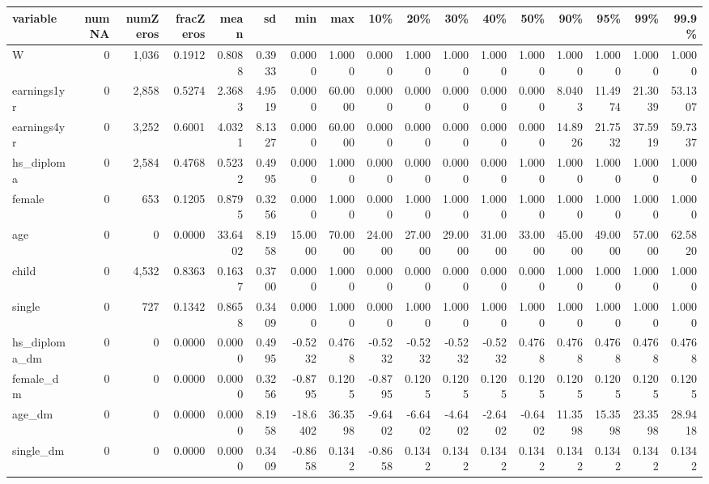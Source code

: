
\begin{tabular}{lrrrrrrrrrrrrrrrr}
\toprule
variable & numNA & numZeros & fracZeros & mean & sd & min & max & 10\% & 20\% & 30\% & 40\% & 50\% & 90\% & 95\% & 99\% & 99.9\%\\
\midrule
W & 0 & 1,036 & 0.1912 & 0.8088 & 0.3933 & 0.0000 & 1.0000 & 0.0000 & 1.0000 & 1.0000 & 1.0000 & 1.0000 & 1.0000 & 1.0000 & 1.0000 & 1.0000\\
earnings1yr & 0 & 2,858 & 0.5274 & 2.3683 & 4.9519 & 0.0000 & 60.0000 & 0.0000 & 0.0000 & 0.0000 & 0.0000 & 0.0000 & 8.0403 & 11.4974 & 21.3039 & 53.1307\\
earnings4yr & 0 & 3,252 & 0.6001 & 4.0321 & 8.1327 & 0.0000 & 60.0000 & 0.0000 & 0.0000 & 0.0000 & 0.0000 & 0.0000 & 14.8926 & 21.7532 & 37.5919 & 59.7337\\
hs\_diploma & 0 & 2,584 & 0.4768 & 0.5232 & 0.4995 & 0.0000 & 1.0000 & 0.0000 & 0.0000 & 0.0000 & 0.0000 & 1.0000 & 1.0000 & 1.0000 & 1.0000 & 1.0000\\
female & 0 & 653 & 0.1205 & 0.8795 & 0.3256 & 0.0000 & 1.0000 & 0.0000 & 1.0000 & 1.0000 & 1.0000 & 1.0000 & 1.0000 & 1.0000 & 1.0000 & 1.0000\\
\addlinespace
age & 0 & 0 & 0.0000 & 33.6402 & 8.1958 & 15.0000 & 70.0000 & 24.0000 & 27.0000 & 29.0000 & 31.0000 & 33.0000 & 45.0000 & 49.0000 & 57.0000 & 62.5820\\
child & 0 & 4,532 & 0.8363 & 0.1637 & 0.3700 & 0.0000 & 1.0000 & 0.0000 & 0.0000 & 0.0000 & 0.0000 & 0.0000 & 1.0000 & 1.0000 & 1.0000 & 1.0000\\
single & 0 & 727 & 0.1342 & 0.8658 & 0.3409 & 0.0000 & 1.0000 & 0.0000 & 1.0000 & 1.0000 & 1.0000 & 1.0000 & 1.0000 & 1.0000 & 1.0000 & 1.0000\\
hs\_diploma\_dm & 0 & 0 & 0.0000 & 0.0000 & 0.4995 & -0.5232 & 0.4768 & -0.5232 & -0.5232 & -0.5232 & -0.5232 & 0.4768 & 0.4768 & 0.4768 & 0.4768 & 0.4768\\
female\_dm & 0 & 0 & 0.0000 & 0.0000 & 0.3256 & -0.8795 & 0.1205 & -0.8795 & 0.1205 & 0.1205 & 0.1205 & 0.1205 & 0.1205 & 0.1205 & 0.1205 & 0.1205\\
\addlinespace
age\_dm & 0 & 0 & 0.0000 & 0.0000 & 8.1958 & -18.6402 & 36.3598 & -9.6402 & -6.6402 & -4.6402 & -2.6402 & -0.6402 & 11.3598 & 15.3598 & 23.3598 & 28.9418\\
single\_dm & 0 & 0 & 0.0000 & 0.0000 & 0.3409 & -0.8658 & 0.1342 & -0.8658 & 0.1342 & 0.1342 & 0.1342 & 0.1342 & 0.1342 & 0.1342 & 0.1342 & 0.1342\\
\bottomrule
\end{tabular}
